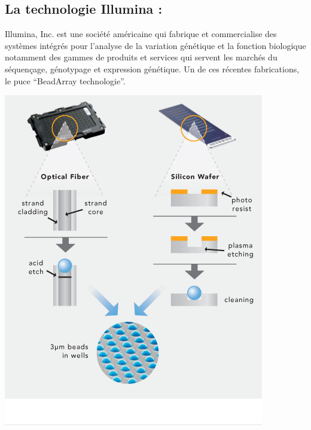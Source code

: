 \documentclass[a4paper,10pt]{article}
\begin{document}
\subsection{La technologie Illumina :}
Illumina, Inc. est une société américaine qui fabrique et commercialise des systèmes intégrés pour l'analyse de la variation génétique et la fonction biologique 
notamment des gammes de produits et services qui servent les marchés du séquençage, génotypage et expression génétique.
\newline
Un de ces récentes fabrications, le puce ``BeadArray technologie''.
\begin{center}
 \includegraphics[scale=0.5]{./image/beadarray.png}
\end{center}
\end{document}
